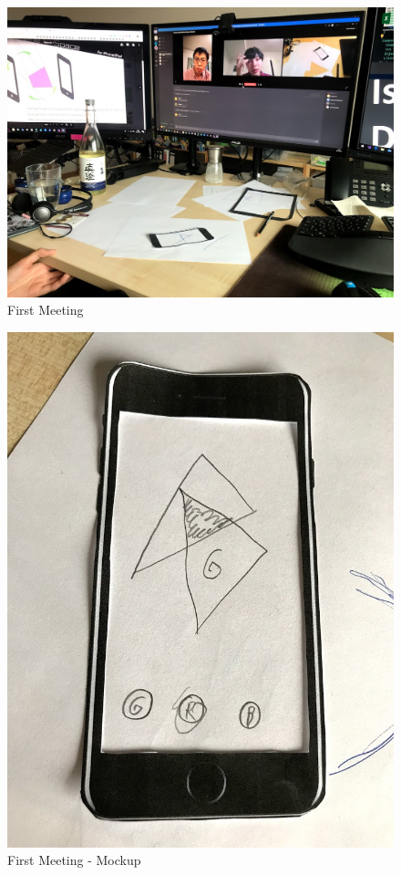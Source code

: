 \begin{figure}[htbp]
	\centering
		\includegraphics[width=1.00\textwidth]{img/FirstMeeting1.png}
	\caption[First Meeting]{First Meeting}
	\label{fig:PointAndLineToPlane}
\end{figure}

\begin{figure}[htbp]
	\centering
		\includegraphics[width=1.00\textwidth]{img/FirstMeeting2.png}
	\caption[First Meeting - Mockup]{First Meeting - Mockup}
	\label{fig:PointAndLineToPlane}
\end{figure}

